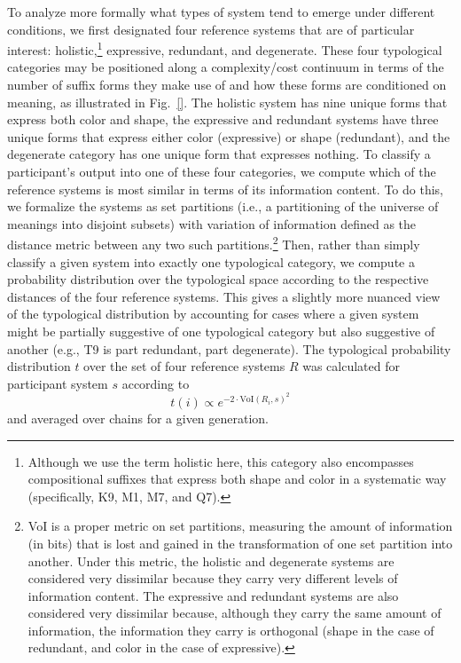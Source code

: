 \documentclass[doc,biblatex]{apa7}
\begin{document}
To analyze more formally what types of system tend to emerge under different conditions, we first designated four reference systems that are of particular interest: holistic,\footnote{Although we use the term holistic here, this category also encompasses compositional suffixes that express both shape and color in a systematic way (specifically, K9, M1, M7, and Q7).} expressive, redundant, and degenerate. These four typological categories may be positioned along a complexity/cost continuum in terms of the number of suffix forms they make use of and how these forms are conditioned on meaning, as illustrated in Fig.~\ref{}. The holistic system has nine unique forms that express both color and shape, the expressive and redundant systems have three unique forms that express either color (expressive) or shape (redundant), and the degenerate category has one unique form that expresses nothing. To classify a participant's output into one of these four categories, we compute which of the reference systems is most similar in terms of its information content. To do this, we formalize the systems as set partitions (i.e., a partitioning of the universe of meanings into disjoint subsets) with variation of information \parencite[VoI;][]{Meila:2007} defined as the distance metric between any two such partitions.\footnote{VoI is a proper metric on set partitions, measuring the amount of information (in bits) that is lost and gained in the transformation of one set partition into another. Under this metric, the holistic and degenerate systems are considered very dissimilar because they carry very different levels of information content. The expressive and redundant systems are also considered very dissimilar because, although they carry the same amount of information, the information they carry is orthogonal (shape in the case of redundant, and color in the case of expressive).} Then, rather than simply classify a given system into exactly one typological category, we compute a probability distribution over the typological space according to the respective distances of the four reference systems. This gives a slightly more nuanced view of the typological distribution by accounting for cases where a given system might be partially suggestive of one typological category but also suggestive of another (e.g., T9 is part redundant, part degenerate). The typological probability distribution $t$ over the set of four reference systems $R$ was calculated for participant system $s$ according to%
\begin{equation}
	t(i) \propto e^{-2 \cdot \mathrm{VoI}(R_i, s)^2}
\end{equation}
and averaged over chains for a given generation.
\end{document}
